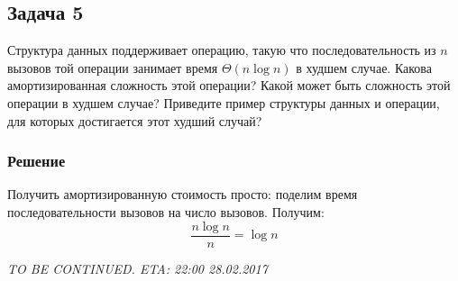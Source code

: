 \documentclass[a4letter,12pt]{article}
\begin{document}
	
	\subsection*{Задача 5}
	Структура данных поддерживает операцию, такую что последовательность из $n$ вызовов той операции занимает время $\Theta(n\log n)$ в худшем случае. Какова амортизированная сложность этой операции? Какой может быть сложность этой операции в худшем случае? Приведите пример структуры данных и операции, для которых достигается этот худший случай?
	
	\subsubsection*{Решение}
	
	Получить амортизированную стоимость просто: поделим время последовательности вызовов на число вызовов. Получим:
	\[
	\frac{n\log n}{n} = \log n
	\]
	
	\textit{TO BE CONTINUED. ETA: 22:00 28.02.2017}
	

	
	
	
	
	
	
	
	
	
	
	
	
\end{document}
